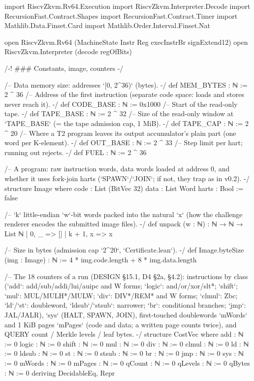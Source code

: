 \begin{leancode}[fontsize=\scriptsize,label={\footnotesize Contract/Machine.lean}]
import RiscvZkvm.Rv64.Execution
import RiscvZkvm.Interpreter.Decode
import RecursionFast.Contract.Shapes
import RecursionFast.Contract.Timer
import Mathlib.Data.Finset.Card
import Mathlib.Order.Interval.Finset.Nat

open RiscvZkvm.Rv64 (MachineState Instr Reg execInstrBr signExtend12)
open RiscvZkvm.Interpreter (decode regOfBits)

/-! ### Constants, image, counters -/

/-- Data memory size: addresses `[0, 2^36)` (bytes). -/
def MEM_BYTES : ℕ := 2 ^ 36
/-- Address of the first instruction (separate code space: loads and stores never reach it). -/
def CODE_BASE : ℕ := 0x1000
/-- Start of the read-only tape. -/
def TAPE_BASE : ℕ := 2 ^ 32
/-- Size of the read-only window at `TAPE_BASE` (= the tape admission cap, 1 MiB). -/
def TAPE_CAP : ℕ := 2 ^ 20
/-- Where a T2 program leaves its output accumulator's plain part (one word per K-element). -/
def OUT_BASE : ℕ := 2 ^ 33
/-- Step limit per hart; running out rejects. -/
def FUEL : ℕ := 2 ^ 36

/-- A program: raw instruction words, data words loaded at address 0, and whether it uses
fork-join harts (`SPAWN`/`JOIN`; if not, they trap as in v0.2). -/
structure Image where
  code : List (BitVec 32)
  data : List Word
  harts : Bool := false

/-- `k` little-endian `w`-bit words packed into the natural `x` (how the challenge renderer
encodes the submitted image files). -/
def unpack (w : ℕ) : ℕ → ℕ → List ℕ
  | 0, _ => []
  | k + 1, x => x %

/-- Size in bytes (admission cap `2^20`, `Certificate.lean`). -/
def Image.byteSize (img : Image) : ℕ := 4 * img.code.length + 8 * img.data.length

/-- The 18 counters of a run (DESIGN §15.1, D4 §2a, §4.2): instructions by class (`add`:
add/sub/addi/lui/auipc and W forms; `logic`: and/or/xor/slt*; `shift`; `mul`: MUL/MULH*/MULW;
`div`: DIV*/REM* and W forms; `clmul`: Zbc; `ld`/`st`: doubleword, `ldsub`/`stsub`: narrower;
`br`: conditional branches; `jmp`: JAL/JALR), `sys` (HALT, SPAWN, JOIN), first-touched
doublewords `mWords` and 1 KiB pages `mPages` (code and data; a written page counts twice),
and QUERY count / Merkle levels / leaf bytes. -/
structure CostVec where
  add : ℕ := 0
  logic : ℕ := 0
  shift : ℕ := 0
  mul : ℕ := 0
  div : ℕ := 0
  clmul : ℕ := 0
  ld : ℕ := 0
  ldsub : ℕ := 0
  st : ℕ := 0
  stsub : ℕ := 0
  br : ℕ := 0
  jmp : ℕ := 0
  sys : ℕ := 0
  mWords : ℕ := 0
  mPages : ℕ := 0
  qCount : ℕ := 0
  qLevels : ℕ := 0
  qBytes : ℕ := 0
  deriving DecidableEq, Repr


\end{leancode}
